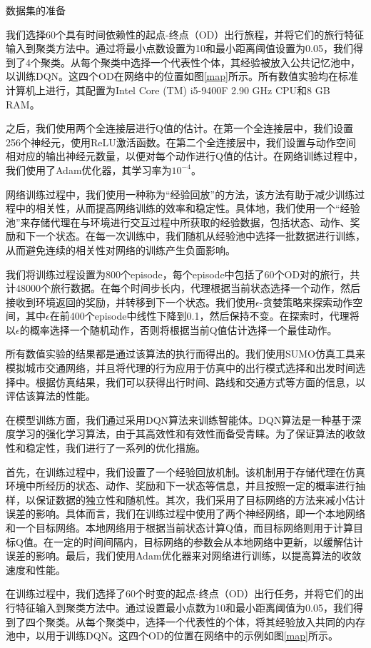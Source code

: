 数据集的准备

我们选择60个具有时间依赖性的起点-终点（OD）出行旅程，并将它们的旅行特征输入到聚类方法中。通过将最小点数设置为10和最小距离阈值设置为0.05，我们得到了4个聚类。从每个聚类中选择一个代表性个体，其经验被放入公共记忆池中，以训练DQN。这四个OD在网络中的位置如图\ref{map}所示。所有数值实验均在标准计算机上进行，其配置为Intel Core (TM) i5-9400F 2.90 GHz CPU和8 GB RAM。

之后，我们使用两个全连接层进行Q值的估计。在第一个全连接层中，我们设置256个神经元，使用ReLU激活函数。在第二个全连接层中，我们设置与动作空间相对应的输出神经元数量，以便对每个动作进行Q值的估计。在网络训练过程中，我们使用了Adam优化器，其学习率为$10^{-4}$。

网络训练过程中，我们使用一种称为“经验回放”的方法，该方法有助于减少训练过程中的相关性，从而提高网络训练的效率和稳定性。具体地，我们使用一个“经验池”来存储代理在与环境进行交互过程中所获取的经验数据，包括状态、动作、奖励和下一个状态。在每一次训练中，我们随机从经验池中选择一批数据进行训练，从而避免连续的相关性对网络的训练产生负面影响。

我们将训练过程设置为800个episode，每个episode中包括了60个OD对的旅行，共计48000个旅行数据。在每个时间步长内，代理根据当前状态选择一个动作，然后接收到环境返回的奖励，并转移到下一个状态。我们使用$\epsilon$-贪婪策略来探索动作空间，其中$\epsilon$在前400个episode中线性下降到0.1，然后保持不变。在探索时，代理将以$\epsilon$的概率选择一个随机动作，否则将根据当前Q值估计选择一个最佳动作。

所有数值实验的结果都是通过该算法的执行而得出的。我们使用SUMO仿真工具来模拟城市交通网络，并且将代理的行为应用于仿真中的出行模式选择和出发时间选择中。根据仿真结果，我们可以获得出行时间、路线和交通方式等方面的信息，以评估该算法的性能。

在模型训练方面，我们通过采用DQN算法来训练智能体。DQN算法是一种基于深度学习的强化学习算法，由于其高效性和有效性而备受青睐。为了保证算法的收敛性和稳定性，我们进行了一系列的优化措施。

首先，在训练过程中，我们设置了一个经验回放机制。该机制用于存储代理在仿真环境中所经历的状态、动作、奖励和下一状态等信息，并且按照一定的概率进行抽样，以保证数据的独立性和随机性。其次，我们采用了目标网络的方法来减小估计误差的影响。具体而言，我们在训练过程中使用了两个神经网络，即一个本地网络和一个目标网络。本地网络用于根据当前状态计算Q值，而目标网络则用于计算目标Q值。在一定的时间间隔内，目标网络的参数会从本地网络中更新，以缓解估计误差的影响。最后，我们使用Adam优化器来对网络进行训练，以提高算法的收敛速度和性能。

在训练过程中，我们选择了60个时变的起点-终点（OD）出行任务，并将它们的出行特征输入到聚类方法中。通过设置最小点数为10和最小距离阈值为0.05，我们得到了四个聚类。从每个聚类中，选择一个代表性的个体，将其经验放入共同的内存池中，以用于训练DQN。这四个OD的位置在网络中的示例如图\ref{map}所示。

